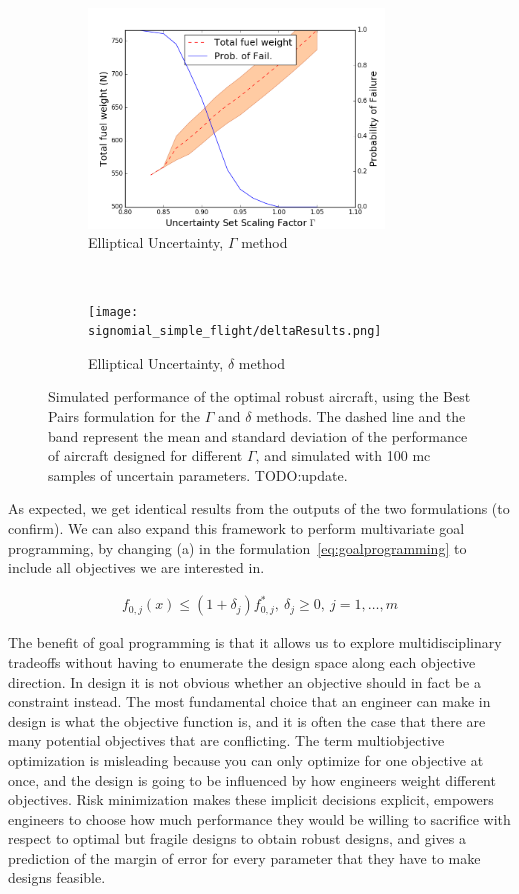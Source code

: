 \begin{figure}[ht]
    \centering
    \captionsetup{justification=centering, font=small}
    \begin{subfigure}{0.49\textwidth}
        \centering
        \includegraphics[height=2.3in]{signomial_simple_flight/ell_best_pairs.png}
         \caption{Elliptical Uncertainty, $\Gamma$ method}
    \end{subfigure}%
    ~
    \begin{subfigure}{0.49\textwidth}
        \centering
        \texttt{[image: signomial\_simple\_flight/deltaResults.png]}
         \caption{Elliptical Uncertainty, $\delta$ method}
    \end{subfigure}
    \caption{Simulated performance of the optimal robust aircraft, using the Best Pairs formulation
    for the $\Gamma$ and $\delta$ methods.
    The dashed line and the band represent the mean and standard deviation of the performance
    of aircraft designed for different $\Gamma$,
    and simulated with 100 \gls{mc} samples of uncertain parameters. TODO:update.}
    \label{fig:deltaVsGamma}
\end{figure}

As expected, we get identical results from the outputs of the two formulations (to confirm).
We can also expand this framework to perform multivariate goal programming,
by changing (a) in the formulation~\ref{eq:goalprogramming} to include all
objectives we are interested in.

\begin{align*}
    f_{0,j}(x) \leq (1+\delta_j) f^*_{0,j},~\delta_j \geq 0,~j = 1,\ldots, m
    \label{eq:multigoal}
\end{align*}

The benefit of goal programming is that it allows us to explore multidisciplinary tradeoffs without
having to enumerate the design space along each objective direction.
In design it is not obvious whether an objective should in fact be a constraint instead. The most
fundamental choice that an engineer can make in design is what the objective function is, and it is
often the case that there are many potential objectives that are conflicting.
The term multiobjective optimization is misleading
because you can only optimize for one objective at once,
and the design is going to be influenced by how engineers weight different objectives.
Risk minimization makes these implicit decisions explicit, empowers engineers to choose
how much performance they would be willing to sacrifice with respect
to optimal but fragile designs to obtain robust designs, and gives a prediction of the margin of error
for every parameter that they have to make designs feasible.

